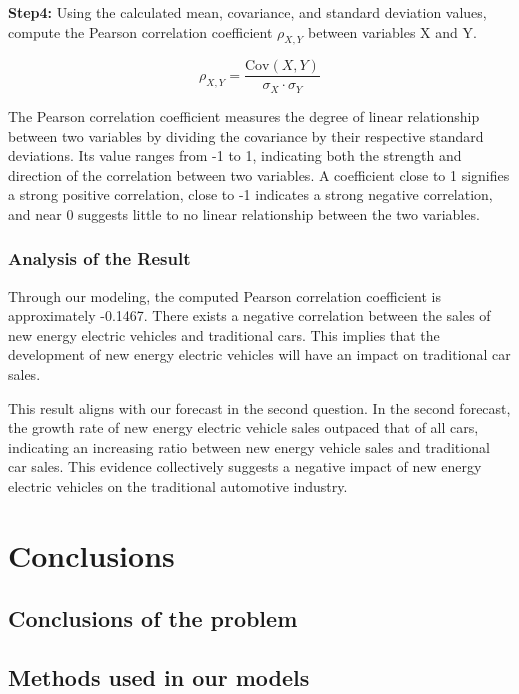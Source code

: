 \documentclass{apmcmthesis}
\begin{document}
\textbf{Step4: }Using the calculated mean, covariance, and standard deviation values, compute the Pearson correlation coefficient $\rho_{X,Y}$ between variables X and Y.

\begin{equation}
	\rho_{X,Y} = \frac{\text{Cov}(X, Y)}{\sigma_X \cdot \sigma_Y}
\end{equation}

The Pearson correlation coefficient measures the degree of linear relationship between two variables by dividing the covariance by their respective standard deviations. Its value ranges from -1 to 1, indicating both the strength and direction of the correlation between two variables. A coefficient close to 1 signifies a strong positive correlation, close to -1 indicates a strong negative correlation, and near 0 suggests little to no linear relationship between the two variables.


\subsubsection{Analysis of the Result}

Through our modeling, the computed Pearson correlation coefficient is approximately -0.1467. There exists a negative correlation between the sales of new energy electric vehicles and traditional cars. This implies that the development of new energy electric vehicles will have an impact on traditional car sales.

This result aligns with our forecast in the second question. In the second forecast, the growth rate of new energy electric vehicle sales outpaced that of all cars, indicating an increasing ratio between new energy vehicle sales and traditional car sales. This evidence collectively suggests a negative impact of new energy electric vehicles on the traditional automotive industry.




\section{Conclusions}



\subsection{Conclusions of the problem}



\subsection{Methods used in our models}
\end{document}
